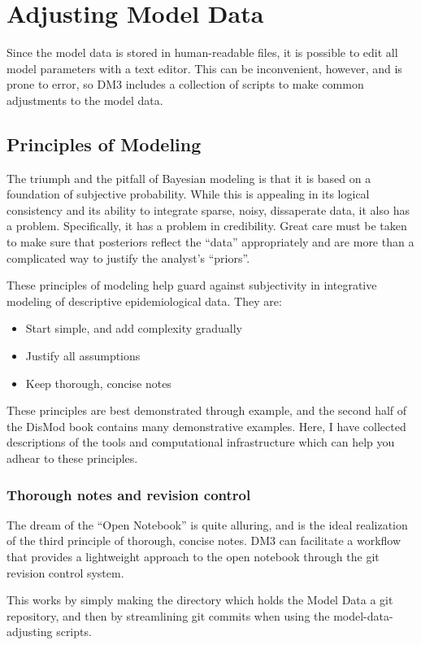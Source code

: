 \chapter{Adjusting Model Data}
Since the model data is stored in human-readable files, it is possible
to edit all model parameters with a text editor.  This can be
inconvenient, however, and is prone to error, so DM3 includes a
collection of scripts to make common adjustments to the model data.

\section{Principles of Modeling}
The triumph and the pitfall of Bayesian modeling is that it is based
on a foundation of subjective probability.  While this is appealing in
its logical consistency and its ability to integrate sparse, noisy,
dissaperate data, it also has a problem.  Specifically, it has a
problem in credibility.  Great care must be taken to make sure that
posteriors reflect the ``data'' appropriately and are more than a
complicated way to justify the analyst's ``priors''.

These principles of modeling help guard against subjectivity in
integrative modeling of descriptive epidemiological data.  They are:
\begin{itemize}
\item Start simple, and add complexity gradually
\item Justify all assumptions
\item Keep thorough, concise notes
\end{itemize}

These principles are best demonstrated through example, and the second
half of the DisMod book contains many demonstrative examples.  Here, I
have collected descriptions of the tools and computational
infrastructure which can help you adhear to these principles.


\subsection{Thorough notes and revision control}
The dream of the ``Open Notebook'' is quite alluring, and is the ideal
realization of the third principle of thorough, concise notes.  DM3
can facilitate a workflow that provides a lightweight approach to the
open notebook through the git revision control system.

This works by simply making the directory which holds the Model Data a
git repository, and then by streamlining git commits when using the
model-data-adjusting scripts.


